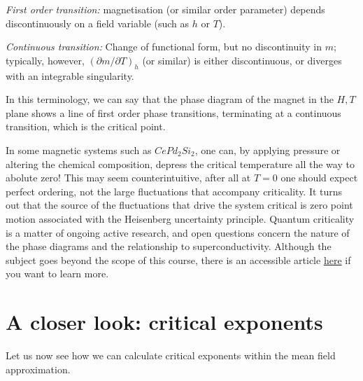 \documentclass[
  letterpaper,
  enabledeprecatedfontcommands]{report}
\begin{document}
\emph{First order transition:} magnetisation (or similar order
parameter) depends discontinuously on a field variable (such as \(h\) or
\(T\)).

\emph{Continuous transition:} Change of functional form, but no
discontinuity in \(m\); typically, however,
\((\partial m/\partial T)_h\) (or similar) is either discontinuous, or
diverges with an integrable singularity.

In this terminology, we can say that the phase diagram of the magnet in
the \(H,T\) plane shows a line of first order phase transitions,
terminating at a continuous transition, which is the critical point.

\begin{tcolorbox}[enhanced jigsaw, toprule=.15mm, opacityback=0, colbacktitle=quarto-callout-caution-color!10!white, title=\textcolor{quarto-callout-caution-color}{\faFire}\hspace{0.5em}{Aside on Quantum Criticality}, leftrule=.75mm, rightrule=.15mm, bottomtitle=1mm, breakable, colframe=quarto-callout-caution-color-frame, colback=white, toptitle=1mm, left=2mm, titlerule=0mm, coltitle=black, arc=.35mm, bottomrule=.15mm, opacitybacktitle=0.6]

In some magnetic systems such as \(CePd_2Si_2\), one can, by applying
pressure or altering the chemical composition, depress the critical
temperature all the way to abolute zero! This may seem counterintuitive,
after all at \(T=0\) one should expect perfect ordering, not the large
fluctuations that accompany criticality. It turns out that the source of
the fluctuations that drive the system critical is zero point motion
associated with the Heisenberg uncertainty principle. Quantum
criticality is a matter of ongoing active research, and open questions
concern the nature of the phase diagrams and the relationship to
superconductivity. Although the subject goes beyond the scope of this
course, there is an accessible article
\href{https://arxiv.org/abs/1102.4628}{here} if you want to learn more.

\end{tcolorbox}

\section{A closer look: critical
exponents}\label{a-closer-look-critical-exponents}

Let us now see how we can calculate critical exponents within the mean
field approximation.
\end{document}
